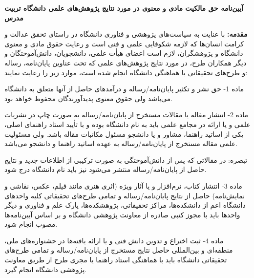 %
%
%
%
%
%
\begin{center}
\textbf{
آیین‌نامه حق مالکیت مادی و معنوی در مورد نتایج پژوهش‌های علمی دانشگاه تربیت مدرس
}
\end{center}
\thispagestyle{empty}
\fontsize{3.4mm}{3.4mm}\selectfont \textbf{
مقدمه:
}
با عنایت به سیاست‌های پژوهشی و فناوری دانشگاه در راستای تحقق عدالت و کرامت انسان‌ها که لازمه شکوفایی علمی و فنی است و رعایت حقوق مادی و معنوی دانشگاه و پژوهشگران، لازم است اعضای هیأت علمی، دانشجویان، دانش‌آموختگان و دیگر همکاران طرح، در مورد نتایج پژوهش‌های علمی که تحت عناوین پایان‌نامه، رساله و طرح‌های تحقیقاتی با هماهنگی دانشگاه انجام شده است، موارد زیر را رعایت نمایند:

ماده 1- حق نشر و تکثیر پایان‌نامه/رساله و درآمدهای حاصل از آنها متعلق به دانشگاه می‌باشد ولی حقوق معنوی پدیدآورندگان محفوظ خواهد بود.

ماده 2- انتشار مقاله یا مقالات مستخرج از پایان‌نامه/رساله به صورت چاپ در نشریات علمی و یا ارائه در مجامع علمی باید به نام دانشگاه بوده و با تأیید استاد راهنمای اصلی، یکی از اساتید راهنما، مشاور و یا دانشجو مسئول مکاتبات مقاله باشد. ولی مسئولیت علمی مقاله مستخرج از پایان‌نامه/رساله به عهده اساتید راهنما و دانشجو می‌باشد. 

تبصره: در مقالاتی که پس از دانش‌آموختگی به صورت ترکیبی از اطلاعات جدید و نتایج حاصل از پایان‌نامه/رساله منتشر می‌شود نیز باید نام دانشگاه درج شود.

ماده 3- انتشار کتاب، نرم‌افزار و یا آثار ویژه (اثری هنری مانند فیلم، عکس، نقاشی و نمایش‌نامه) حاصل از نتایج پایان‌نامه/رساله و تمامی طرح‌های تحقیقاتی کلیه واحدهای دانشگاه اعم از دانشکده‌ها، مراکز تحقیقاتی، پژوهشکده‌ها، پارک علم و فناوری و دیگر واحدها باید با مجوز کتبی صادره از معاونت پژوهشی دانشگاه و بر اساس آیین‌نامه‌ها مصوب انجام شود.

ماده 4- ثبت اختراع و تدوین دانش فنی و یا ارائه یافته‌ها در جشنواره‌های ملی، منطقه‌ای و بین‌المللی حاصل نتایج مستخرج از پایان‌نامه/رساله و تمامی طرح‌های تحقیقاتی دانشگاه باید با هماهنگی استاد راهنما یا مجری طرح از طریق معاونت پژوهشی دانشگاه انجام گیرد.

